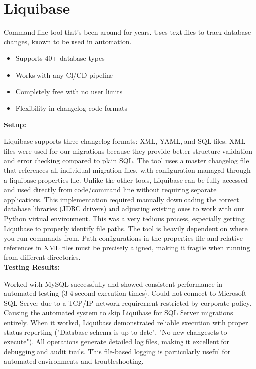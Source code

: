\documentclass[11pt,a4paper]{article}
\begin{document}
\newpage
\section{Liquibase}

Command-line tool that's been around for years. Uses text files to track database changes, known to be used in automation.

\begin{itemize}
    \item Supports 40+ database types
    \item Works with any CI/CD pipeline
    \item Completely free with no user limits
    \item Flexibility in changelog code formats
\end{itemize}

\textbf{Setup:}

Liquibase supports three changelog formats: XML, YAML, and SQL files.
XML files were used for our migrations because they provide better structure validation and error checking compared to plain SQL.
The tool uses a master changelog file that references all individual migration files, with configuration managed through a liquibase.properties file. 
Unlike the other tools, Liquibase can be fully accessed and used directly from code/command line without requiring separate applications.
This implementation required manually downloading the correct database libraries (JDBC drivers) and adjusting existing ones to work with our Python virtual environment.
This was a very tedious process, especially getting Liquibase to properly identify file paths.
The tool is heavily dependent on where you run commands from.
Path configurations in the properties file and relative references in XML files must be precisely aligned, making it fragile when running from different directories.\\

\textbf{Testing Results:}

Worked with MySQL successfully and showed consistent performance in automated testing (3-4 second execution times).
Could not connect to Microsoft SQL Server due to a TCP/IP network requirement restricted by corporate policy. 
Causing the automated system to skip Liquibase for SQL Server migrations entirely.
When it worked, Liquibase demonstrated reliable execution with proper status reporting ("Database schema is up to date", "No new changesets to execute").
All operations generate detailed log files, making it excellent for debugging and audit trails.
This file-based logging is particularly useful for automated environments and troubleshooting.\\
\end{document}
